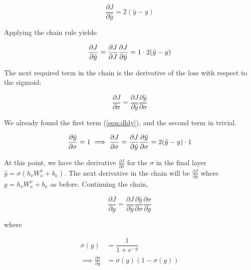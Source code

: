 \begin{equation}
\frac{\partial J}{\partial \hat{y}} = 2(\hat{y} - y )
\end{equation}

\noindent Applying the chain rule yields:

\begin{equation}
\label{eqn:dldy}
\frac{\partial J}{\partial \hat{y}} = \frac{\partial J}{\partial J}\frac{\partial J}{\partial \hat{y}} \\
= 1 \cdot 2(\hat{y} - y )
\end{equation}

\noindent The next required term in the chain is the derivative of the loss with respect to the sigmoid:

\begin{equation}
\frac{\partial J}{\partial \sigma} = \frac{\partial J}{\partial \hat{y}} \frac{\partial \hat{y}}{\partial \sigma}
\end{equation}

\noindent We already found the first term (\ref{eqn:dldy}), and the second term in trivial.

\begin{equation}
    \frac{\partial \hat{y}}{\partial \sigma} = 1 \\
    \implies \frac{\partial J}{\partial \sigma} =  \frac    {\partial J}{\partial \hat{y}} \frac{\partial \hat{y}}  {\partial \sigma} \\
    = 2(\hat{y} - y ) \cdot 1
\end{equation}

\noindent At this point, we have the derivative $ \frac{\partial J}{\partial \sigma} $ for the $ \sigma $ in the final layer $ \hat{y} = \sigma \left( h_\nu W_\kappa ^\nu + b_\kappa \right) $. The next derivative in the chain will be $ \frac{\partial J}{\partial g} $ where $ g = h_\nu W_\kappa ^\nu + b_\kappa $ as before. Continuing the chain,

\begin{equation}
\frac{\partial J}{\partial g} = \frac{\partial J}{\partial \hat{y}} \frac{\partial \hat{y}}{\partial \sigma} \frac{\partial \sigma}{\partial g}
\end{equation}

\noindent where

\begin{align}
\sigma(g) &= \dfrac{1}{1 + e^{-g}} \\
\implies \frac{\partial \sigma}{\partial g} &= \sigma(g)(1 - \sigma(g))
\end{align}

